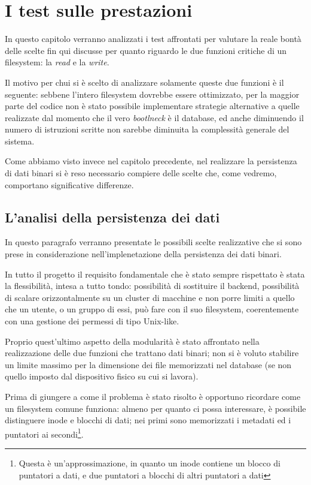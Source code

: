 \chapter{I test sulle prestazioni}

In questo capitolo verranno analizzati i test affrontati per valutare la reale bontà delle scelte fin qui discusse per quanto riguardo le due funzioni critiche di un filesystem: la \emph{read} e la \emph{write}.

Il motivo per chui si è scelto di analizzare solamente queste due funzioni è il seguente: sebbene l'intero filesystem dovrebbe essere ottimizzato, per la maggior parte del codice non è stato possibile implementare strategie alternative a quelle realizzate dal momento che il vero \emph{bootlneck} è il database, ed anche diminuendo il numero di istruzioni scritte non sarebbe diminuita la complessità generale del sistema.

Come abbiamo visto invece nel capitolo precedente, nel realizzare la persistenza di dati binari si è reso necessario compiere delle scelte che, come vedremo, comportano significative differenze.

\section{L'analisi della persistenza dei dati}
In questo paragrafo verranno presentate le possibili scelte realizzative che si sono prese in considerazione nell'implenetazione della persistenza dei dati binari.

In tutto il progetto il requisito fondamentale che è stato sempre rispettato è stata la flessibilità, intesa a tutto tondo: possibilità di sostituire il backend, possibilità di scalare orizzontalmente su un cluster di macchine e non porre limiti a quello che un utente, o un gruppo di essi, può fare con il suo filesystem, coerentemente con una gestione dei permessi di tipo Unix-like.

Proprio quest'ultimo aspetto della modularità è stato affrontato nella realizzazione delle due funzioni che trattano dati binari; non si è voluto stabilire un limite massimo per la dimensione dei file memorizzati nel database (se non quello imposto dal dispositivo fisico su cui si lavora).

Prima di giungere a come il problema è stato risolto è opportuno ricordare come un filesystem comune funziona: almeno per quanto ci possa interessare, è possibile distinguere inode e blocchi di dati; nei primi sono memorizzati i metadati ed i puntatori ai secondi\footnote{Questa è un'approssimazione, in quanto un inode contiene un blocco di puntatori a dati, e due puntatori a blocchi di altri puntatori a dati}. 

